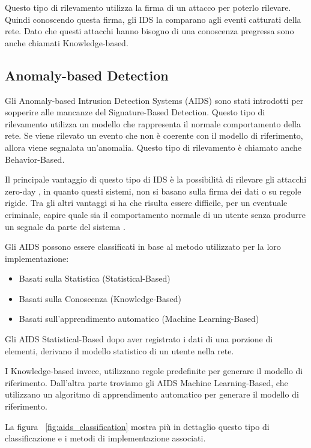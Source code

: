 Questo tipo di rilevamento utilizza la firma di un attacco per poterlo rilevare. Quindi conoscendo questa firma, gli IDS la comparano agli eventi catturati della rete. Dato che questi attacchi hanno bisogno di una conoscenza pregressa sono anche chiamati Knowledge-based.


\subsection{Anomaly-based Detection}

Gli Anomaly-based Intrusion Detection Systems (AIDS) sono stati introdotti per sopperire alle mancanze del Signature-Based Detection.
Questo tipo di rilevamento utilizza un modello che rappresenta il normale comportamento della rete. Se viene rilevato un evento che non è coerente con il modello di riferimento, allora viene segnalata un'anomalia. Questo tipo di rilevamento è chiamato anche Behavior-Based.


Il principale vantaggio di questo tipo di IDS è la possibilità di rilevare gli attacchi zero-day \cite{UnsupervisedAlgorithmsDetect2021}, in quanto questi sistemi, non si basano sulla firma dei dati o su regole rigide. Tra gli altri vantaggi si ha che risulta essere difficile, per un eventuale criminale, capire quale sia il comportamento normale di un utente senza produrre un segnale da parte del sistema \cite{SurveyIntrusionDetection2019}.


\cite{SurveyIntrusionDetection2019} Gli AIDS possono essere classificati in base al metodo utilizzato per la loro implementazione:

\begin{itemize}
    \item Basati sulla Statistica (Statistical-Based)
    \item Basati sulla Conoscenza (Knowledge-Based)
    \item Basati sull'apprendimento automatico (Machine Learning-Based)
\end{itemize}


Gli AIDS Statistical-Based dopo aver registrato i dati di una porzione di elementi, derivano il modello statistico di un utente nella rete. 


I Knowledge-based invece, utilizzano regole predefinite per generare il modello di riferimento.
Dall'altra parte troviamo gli AIDS Machine Learning-Based, che utilizzano un algoritmo di apprendimento automatico per generare il modello di riferimento. 

La figura ~\ref{fig:aids_classification} mostra più in dettaglio questo tipo di classificazione e i metodi di implementazione associati.

